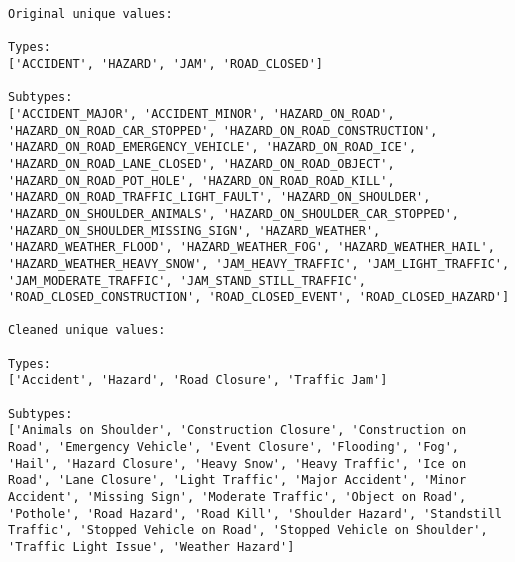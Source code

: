 \documentclass[
  letterpaper,
  DIV=11,
  numbers=noendperiod]{scrartcl}
\begin{document}
\begin{verbatim}
Original unique values:

Types:
['ACCIDENT', 'HAZARD', 'JAM', 'ROAD_CLOSED']

Subtypes:
['ACCIDENT_MAJOR', 'ACCIDENT_MINOR', 'HAZARD_ON_ROAD', 'HAZARD_ON_ROAD_CAR_STOPPED', 'HAZARD_ON_ROAD_CONSTRUCTION', 'HAZARD_ON_ROAD_EMERGENCY_VEHICLE', 'HAZARD_ON_ROAD_ICE', 'HAZARD_ON_ROAD_LANE_CLOSED', 'HAZARD_ON_ROAD_OBJECT', 'HAZARD_ON_ROAD_POT_HOLE', 'HAZARD_ON_ROAD_ROAD_KILL', 'HAZARD_ON_ROAD_TRAFFIC_LIGHT_FAULT', 'HAZARD_ON_SHOULDER', 'HAZARD_ON_SHOULDER_ANIMALS', 'HAZARD_ON_SHOULDER_CAR_STOPPED', 'HAZARD_ON_SHOULDER_MISSING_SIGN', 'HAZARD_WEATHER', 'HAZARD_WEATHER_FLOOD', 'HAZARD_WEATHER_FOG', 'HAZARD_WEATHER_HAIL', 'HAZARD_WEATHER_HEAVY_SNOW', 'JAM_HEAVY_TRAFFIC', 'JAM_LIGHT_TRAFFIC', 'JAM_MODERATE_TRAFFIC', 'JAM_STAND_STILL_TRAFFIC', 'ROAD_CLOSED_CONSTRUCTION', 'ROAD_CLOSED_EVENT', 'ROAD_CLOSED_HAZARD']

Cleaned unique values:

Types:
['Accident', 'Hazard', 'Road Closure', 'Traffic Jam']

Subtypes:
['Animals on Shoulder', 'Construction Closure', 'Construction on Road', 'Emergency Vehicle', 'Event Closure', 'Flooding', 'Fog', 'Hail', 'Hazard Closure', 'Heavy Snow', 'Heavy Traffic', 'Ice on Road', 'Lane Closure', 'Light Traffic', 'Major Accident', 'Minor Accident', 'Missing Sign', 'Moderate Traffic', 'Object on Road', 'Pothole', 'Road Hazard', 'Road Kill', 'Shoulder Hazard', 'Standstill Traffic', 'Stopped Vehicle on Road', 'Stopped Vehicle on Shoulder', 'Traffic Light Issue', 'Weather Hazard']
\end{verbatim}
\end{document}

